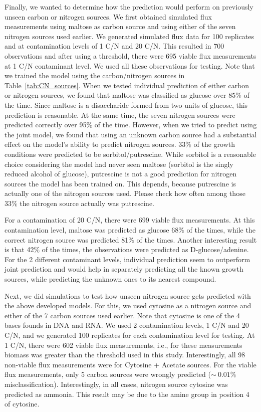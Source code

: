 \documentclass[12pt]{article}
\begin{document}
Finally, we wanted to determine how the prediction would perform on previously unseen carbon or nitrogen sources. We first obtained simulated flux measurements using maltose as carbon source and using either of the seven nitrogen sources used earlier. We generated simulated flux data for 100 replicates and at contamination levels of 1 C/N and 20 C/N. This resulted in 700 observations and after using a threshold, there were 695 viable flux measurements at 1 C/N contaminant level. We used all these observations for testing. Note that we trained the model using the carbon/nitrogen sources in Table~\ref{tab:CN_sources}. When we tested individual prediction of either carbon or nitrogen sources, we found that maltose was classified as glucose over 85\% of the time. Since maltose is a disaccharide formed from two units of glucose, this prediction is reasonable. At the same time, the seven nitrogen sources were predicted correctly over 95\% of the time. However, when we tried to predict using the joint model, we found that using an unknown carbon source had a substantial effect on the model's ability to predict nitrogen sources. 33\% of the growth conditions were predicted to be sorbitol/putrescine. While sorbitol is a reasonable choice considering the model had never seen maltose (sorbitol is the singly reduced alcohol of glucose), putrescine is not a good prediction for nitrogen sources the model has been trained on. {\color{red}This depends, because putrescine is actually one of the nitrogen sources used. Please check how often among those 33\% the nitrogen source actually was putrescine.}

For a contamination of 20 C/N, there were 699 viable flux measurements. At this contamination level, maltose was predicted as glucose 68\% of the times, while the correct nitrogen source was predicted 81\% of the times. Another interesting result is that 42\% of the times, the observations were predicted as D-glucose/adenine. For the 2 different contaminant levels, individual prediction seem to outperform joint prediction and would help in separately predicting all the known growth sources, while predicting the unknown ones to its nearest compound.

Next, we did simulations to test how unseen nitrogen source gets predicted with the above developed models. For this, we used cytosine as a nitrogen source and either of the 7 carbon sources used earlier. Note that cytosine is one of the 4 bases founds in DNA and RNA. We used 2 contamination levels, 1 C/N and 20 C/N, and we generated 100 replicates for each contamination level for testing. At 1 C/N, there were 602 viable flux measurements, i.e., for these measurements biomass was greater than the threshold used in this study. Interestingly, all 98 non-viable flux measurements were for Cytosine + Acetate sources. For the viable flux measurements, only 5 carbon sources were wrongly predicted ($\sim~0.01\%$ misclassification). Interestingly, in all cases, nitrogen source cytosine was predicted as ammonia. This result may be due to the amine group in position 4 of cytosine.
\end{document}
